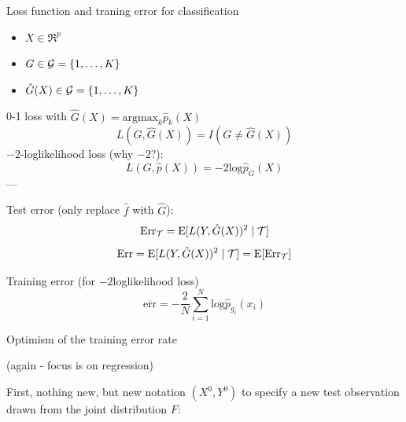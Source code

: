 \documentclass[
  ignorenonframetext,
]{beamer}
\providecommand{\tightlist}{%
  \setlength{\itemsep}{0pt}\setlength{\parskip}{0pt}}
\begin{document}
\begin{frame}

\begin{block}{Loss function and traning error for classification}

\begin{itemize}
\tightlist
\item
  \(X \in \Re^p\)
\item
  \(G \in {\cal G}=\{1,\ldots,K\}\)
\item
  \(\hat{G}(X) \in {\cal G}=\{1,\ldots,K\}\)
\end{itemize}

0-1 loss with \(\hat{G}(X)=\text{argmax}_k \hat{p}_k(X)\)
\[L(G,\hat{G}(X))=I(G\neq \hat{G}(X))\] \(-2\)-loglikelihood loss (why
\(-2\)?): \[ L(G,\hat{p}(X))=-2 \text{log} \hat{p}_G(X)\] ---

Test error (only replace \(\hat{f}\) with \(\hat{G}\)):
\[ \text{Err}_{\cal T}=\text{E}[L(Y,\hat{G}(X))^2\mid {\cal T}]\]
\[ \text{Err}=\text{E}[L(Y,\hat{G}(X))^2\mid {\cal T}]=\text{E} [\text{Err}_{\cal T}]\]

Training error (for \(-2\)loglikelihood loss)
\[\overline{\text{err}}=-\frac{2}{N}\sum_{i=1}^N \text{log}\hat{p}_{g_i}(x_i)\]

\end{block}

\end{frame}

\begin{frame}

\begin{block}{Optimism of the training error rate}

(again - focus is on regression)

First, nothing new, but new notation \((X^0,Y^0)\) to specify a new test
observation drawn from the joint distribution \(F\):

\end{block}

\end{frame}
\end{document}
